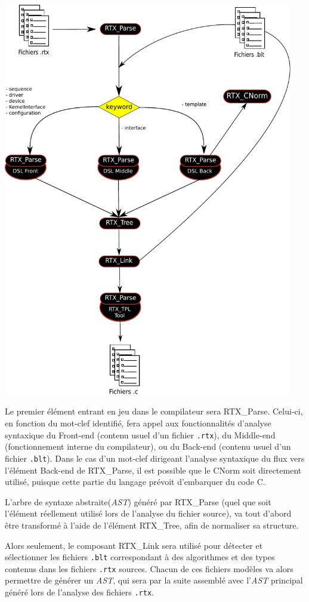 \documentclass{rtxreport}
\begin{document}
\includegraphics[width=0.95\textwidth]{logigramme.pdf}

Le premier élément entrant en jeu dans le compilateur sera  RTX\_Parse.
Celui-ci, en fonction du mot-clef identifié, fera appel aux fonctionnalités
d'analyse syntaxique du Front-end (contenu usuel d'un fichier \texttt{.rtx}),
du Middle-end (fonctionnement interne du compilateur), ou du Back-end
(contenu usuel d'un fichier \texttt{.blt}). Dans le cas d'un mot-clef dirigeant
l'analyse syntaxique du flux vers l'élément Back-end de RTX\_Parse, il est
possible que le CNorm soit directement utilisé, puisque cette partie du langage
prévoit d'embarquer du code C.

L'arbre de syntaxe abstraite(\emph{AST}) généré par RTX\_Parse (quel que soit
l'élément réellement utilisé lors de l'analyse du fichier source), va tout
d'abord être transformé à l'aide de l'élément RTX\_Tree, afin de normaliser
sa structure.

Alors seulement, le composant RTX\_Link sera utilisé pour détecter et
sélectionner les fichiers \texttt{.blt} correspondant à des algorithmes et
des types contenus dans les fichiers \texttt{.rtx} sources. Chacun de ces
fichiers modèles va alors permettre de générer un \emph{AST}, qui sera par
la suite assemblé avec l'\emph{AST} principal généré lors de l'analyse des
fichiers \texttt{.rtx}.
\end{document}
